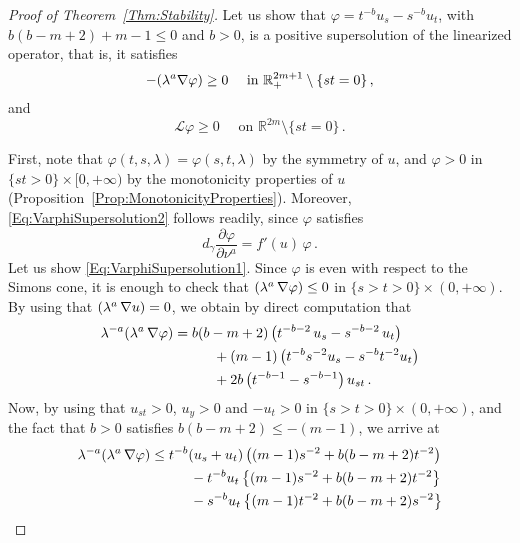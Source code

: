 \documentclass[12pt,reqno]{amsart}
\theoremstyle{definition}
\theoremstyle{remark}
\newcommand{\con}[1]{\mathbb{#1}}
\newcommand{\R}{\con{R}} %
\newcommand{\s}{\gamma}
\let\div\relax
\DeclareMathOperator{\div}{div}
\numberwithin{equation}{section}
\begin{document}
\begin{proof}[Proof of Theorem~\ref{Thm:Stability}]

Let us show that $\varphi = t^{-b}u_s - s^{-b}u_t$, with $b(b-m+2)+m-1\leq 0$ and $b>0$, is a positive supersolution of the linearized operator, that is, it satisfies 
\begin{equation}
\label{Eq:VarphiSupersolution1}
-\div(\lambda^a \nabla \varphi) \geq 0 \quad \text{ in } \R^{2m+1}_+\setminus \{st=0\}\,,
\end{equation} 
and  
\begin{equation}
\label{Eq:VarphiSupersolution2}
\mathscr{L}\varphi \geq 0 \quad \text{ on } \R^{2m}  \setminus \{st=0\}\,.
\end{equation} 

First, note that $ \varphi(t,s,\lambda) = \varphi(s,t,\lambda) $ by the symmetry of $u$, and $\varphi>0$ in $\{st>0\}\times[0,+\infty)$ by the monotonicity properties of $u$ (Proposition~\ref{Prop:MonotonicityProperties}). Moreover, \eqref{Eq:VarphiSupersolution2} follows readily, since $\varphi$  satisfies 
$$ 
d_\s \frac{\partial \varphi}{\partial \nu^a} = f'(u)\,\varphi\,. 
$$
Let us show \eqref{Eq:VarphiSupersolution1}. Since $\varphi$ is even with respect to the Simons cone, it is enough to check that $\div{(\lambda^a\,\nabla\varphi)}\leq 0$ in $\{s>t>0\}\times (0,+\infty)$. By using that $\div(\lambda^a\,\nabla u) = 0$, we obtain by direct computation that 
\begin{align*}
\lambda^{-a} \div(\lambda^a\,\nabla \varphi) &= b(b-m+2) \left( t^{-b-2}\,u_s - s^{-b-2}\,u_t \right) \\
& \hspace{10mm} + (m-1) \left( t^{-b} s^{-2} u_s - s^{-b} t^{-2} u_t \right) \\
& \hspace{10mm} + 2b \left( t^{-b-1} - s^{-b-1} \right) u_{st}\,.
\end{align*}
Now, by using that $u_{st}>0$, $u_y>0$ and $-u_t>0$ in $\{s>t>0\}\times (0,+\infty)$, and the fact that $b>0$ satisfies $b(b-m+2)\leq -(m-1) $, we arrive at
\begin{align*}
\lambda^{-a} \div(\lambda^a\,\nabla \varphi) &\leq t^{-b} (u_s+u_t) \left( (m-1) s^{-2} + b(b-m+2) t^{-2}\right) \\
& \hspace{10mm} - t^{-b} u_t \left\{ (m-1) s^{-2} + b(b-m+2) t^{-2} \right\} \\
& \hspace{10mm} - s^{-b} u_t \left\{ (m-1) t^{-2} + b(b-m+2) s^{-2} \right\} \\

\end{align*}
\end{proof}
\end{document}
